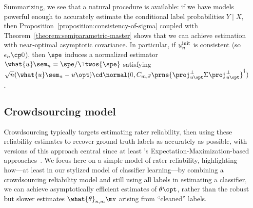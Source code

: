 Summarizing, we see that a natural procedure is available: if we have models
powerful enough to accurately estimate the conditional label probabilities
$Y \mid X$, then Proposition~\ref{proposition:consistency-of-sigma} coupled
with Theorem~\ref{theorem:semiparametric-master} shows that we can achieve
estimation with near-optimal asymptotic covariance. In particular, if
$u_n^{\textup{init}}$ is consistent (so $\uerror_n \cp 0$), then $\spe$ induces a
normalized estimator $\what{u}\sem_n = \spe / \ltwos{\spe}$ satisfying
$\sqrt{n}(\what{u}\sem_n - u\opt) \cd \normal(0, C_{m,\vec{\sigma}}
\prns{\proj_{u\opt}^\perp \Sigma \proj_{u\opt}^\perp}^\dagger)$.



\subsection{Crowdsourcing model}
\label{sec:crowdsourcing}


Crowdsourcing typically targets estimating rater reliability, then using
these reliability estimates to recover ground truth labels as accurately as
possible, with versions of this approach central since at least
\citeauthor{DawidSk79}'s Expectation-Maximization-based
approaches~\cite{DawidSk79, WhitehillWuBeMoRu09, RaykarYuZhVaFlBoMo10}.  We
focus here on a simple model of rater reliability,
highlighting how---at least in our stylized model of classifier
learning---by combining a crowdsourcing reliability model and still using
all labels in estimating a classifier, we can achieve asymptotically
efficient estimates of $\theta\opt$, rather than the robust but slower
estimates $\what{\theta}_{n,m}\mv$ arising from ``cleaned'' labels.


